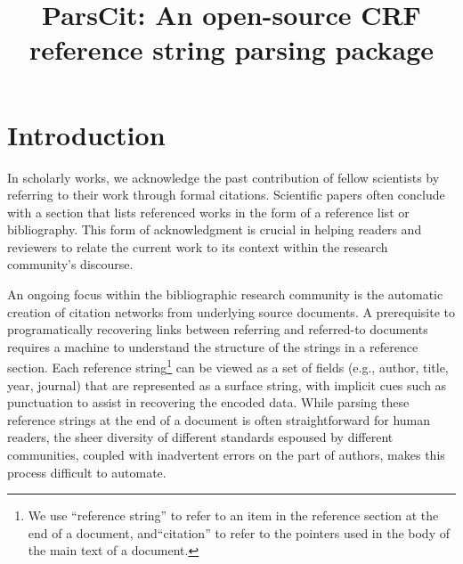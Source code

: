 \documentclass[10pt, a4paper]{article}
\begin{document}
\title{ParsCit: An open-source CRF reference string parsing package}


\address{$^{\ast}$ College of Information Sciences \& Technology \\
         The Pennsylvania State University \\
         \{icouncil,giles\}@ist.psu.edu \\ \\
         $^{\dagger}$Department of Computer Science \\
         National University of Singapore \\  
         kanmy@comp.nus.edu.sg}



\maketitleabstract

\section{Introduction}

In scholarly works, we acknowledge the past contribution of fellow
scientists by referring to their work through formal citations.  Scientific papers often
conclude with a section that lists referenced works in the form of a
reference list or bibliography.  This form of acknowledgment is
crucial in helping readers and reviewers to relate the current work to
its context within the research community's discourse.

An ongoing focus within the bibliographic research community is the
automatic creation of citation networks from underlying source documents. A
prerequisite to programatically recovering links between referring and
referred-to documents requires a machine to understand the structure
of the strings in a reference section.  Each reference
string\footnote{We use ``reference string'' to refer to an item in the
reference section at the end of a document, and``citation'' to refer
to the pointers used in the body of the main text of a document.} can
be viewed as a set of fields (e.g., author, title, year, journal) that
are represented as a surface string, with implicit cues such as
punctuation to assist in recovering the encoded data.  While parsing
these reference strings at the end of a document is often
straightforward for human readers, the sheer diversity of different
standards espoused by different communities, coupled with inadvertent
errors on the part of authors, makes this process difficult to automate.
\end{document}
